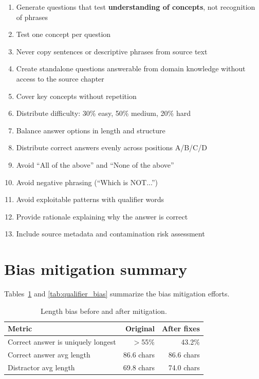 \documentclass[11pt]{article}
\begin{document}
\begin{enumerate}
\item Generate questions that test \textbf{understanding of concepts}, not recognition of phrases
\item Test one concept per question
\item Never copy sentences or descriptive phrases from source text
\item Create standalone questions answerable from domain knowledge without access to the source chapter
\item Cover key concepts without repetition
\item Distribute difficulty: 30\% easy, 50\% medium, 20\% hard
\item Balance answer options in length and structure
\item Distribute correct answers evenly across positions A/B/C/D
\item Avoid ``All of the above'' and ``None of the above''
\item Avoid negative phrasing (``Which is NOT...'')
\item Avoid exploitable patterns with qualifier words
\item Provide rationale explaining why the answer is correct
\item Include source metadata and contamination risk assessment
\end{enumerate}

\section{Bias mitigation summary}

Tables~\ref{tab:length_bias} and \ref{tab:qualifier_bias} summarize the bias mitigation efforts.

\begin{table}[htbp]
  \centering
  \caption{Length bias before and after mitigation.}
  \label{tab:length_bias}
  \begin{tabular}{lrr}
    \toprule
    Metric & Original & After fixes \\
    \midrule
    Correct answer is uniquely longest & $>$55\% & 43.2\% \\
    Correct answer avg length & 86.6 chars & 86.6 chars \\
    Distractor avg length & 69.8 chars & 74.0 chars \\
    \bottomrule
  \end{tabular}
\end{table}
\end{document}
